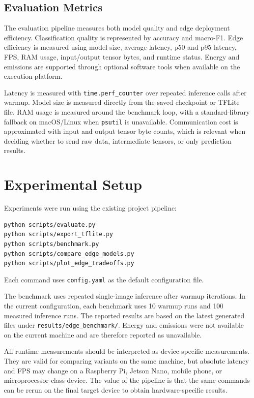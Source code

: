 \documentclass[10pt,journal,onecolumn]{IEEEtran}
\begin{document}
\subsection{Evaluation Metrics}
The evaluation pipeline measures both model quality and edge deployment efficiency. Classification quality is represented by accuracy and macro-F1. Edge efficiency is measured using model size, average latency, p50 and p95 latency, FPS, RAM usage, input/output tensor bytes, and runtime status. Energy and emissions are supported through optional software tools when available on the execution platform.

Latency is measured with \texttt{time.perf\_counter} over repeated inference calls after warmup. Model size is measured directly from the saved checkpoint or TFLite file. RAM usage is measured around the benchmark loop, with a standard-library fallback on macOS/Linux when \texttt{psutil} is unavailable. Communication cost is approximated with input and output tensor byte counts, which is relevant when deciding whether to send raw data, intermediate tensors, or only prediction results.

\section{Experimental Setup}
Experiments were run using the existing project pipeline:

\begin{verbatim}
python scripts/evaluate.py
python scripts/export_tflite.py
python scripts/benchmark.py
python scripts/compare_edge_models.py
python scripts/plot_edge_tradeoffs.py
\end{verbatim}

Each command uses \texttt{config.yaml} as the default configuration file.

The benchmark uses repeated single-image inference after warmup iterations. In the current configuration, each benchmark uses 10 warmup runs and 100 measured inference runs. The reported results are based on the latest generated files under \texttt{results/edge\_benchmark/}. Energy and emissions were not available on the current machine and are therefore reported as unavailable.

All runtime measurements should be interpreted as device-specific measurements. They are valid for comparing variants on the same machine, but absolute latency and FPS may change on a Raspberry Pi, Jetson Nano, mobile phone, or microprocessor-class device. The value of the pipeline is that the same commands can be rerun on the final target device to obtain hardware-specific results.
\end{document}
